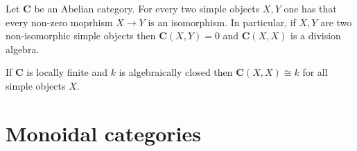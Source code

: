 	\begin{theorem}
		Let $\mathbf{C}$ be an Abelian category. For every two simple objects $X, Y$ one has that every non-zero moprhism $X\rightarrow Y$ is an isomorphism. In particular, if $X, Y$ are two non-isomorphic simple objects then $\mathbf{C}(X, Y)=0$ and $\mathbf{C}(X, X)$ is a division algebra.
	\end{theorem}
	\begin{result}
		If $\mathbf{C}$ is locally finite and $k$ is algebraically closed then $\mathbf{C}(X, X)\cong k$ for all simple objects $X$.
	\end{result}

\section{Monoidal categories}

